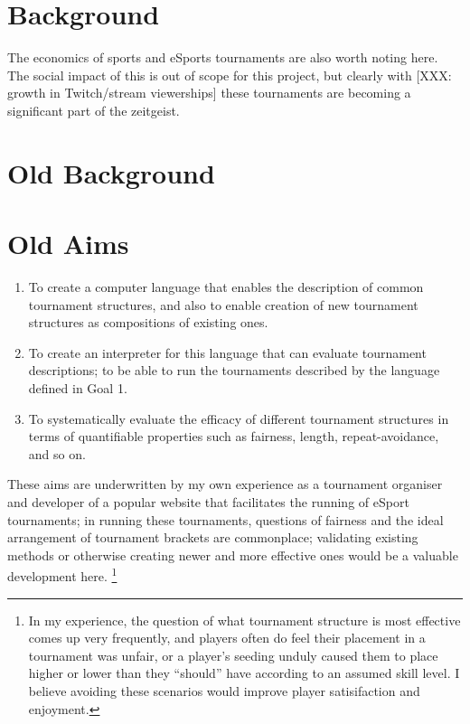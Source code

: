 \documentclass[a4,11pt,twoside,final]{article}
\begin{document}
\newpage

\section{Background}
\label{sec:org2af391e}

The economics of sports and eSports tournaments are also worth noting here.  The
social impact of this is out of scope for this project, but clearly with [XXX:
growth in Twitch/stream viewerships] these tournaments are becoming a
significant part of the zeitgeist.



\section{Old Background}
\label{sec:org6e4e683}

\section{Old Aims}
\label{sec:orgceed3e5}
\begin{enumerate}
\item To create a computer language that enables the description of common
tournament structures, and also to enable creation of new tournament
structures as compositions of existing ones.

\item To create an interpreter for this language that can evaluate tournament
descriptions; to be able to run the tournaments described by the language
defined in Goal 1.
\item To systematically evaluate the efficacy of different tournament structures in
terms of quantifiable properties such as fairness, length, repeat-avoidance,
and so on.
\end{enumerate}

These aims are underwritten by my own experience as a tournament organiser and
developer of a popular website that facilitates the running of eSport
tournaments; in running these tournaments, questions of fairness and the ideal
arrangement of tournament brackets are commonplace; validating existing methods
or otherwise creating newer and more effective ones would be a valuable
development here. \footnote{In my experience, the question of what tournament
structure is most effective comes up very frequently, and players often do feel
their placement in a tournament was unfair, or a player's seeding unduly caused
them to place higher or lower than they ``should'' have according to an assumed
skill level. I believe avoiding these scenarios would improve player
satisifaction and enjoyment.}
\end{document}
